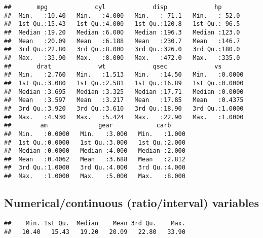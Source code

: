 \documentclass[
  a4paper,
]{article}
\newenvironment{Shaded}{\begin{snugshade}}{\end{snugshade}}
\newcommand{\FunctionTok}[1]{\textcolor[rgb]{0.13,0.29,0.53}{\textbf{#1}}}
\newcommand{\NormalTok}[1]{#1}
\newcommand{\SpecialCharTok}[1]{\textcolor[rgb]{0.81,0.36,0.00}{\textbf{#1}}}
\begin{document}
\begin{verbatim}
##       mpg             cyl             disp             hp       
##  Min.   :10.40   Min.   :4.000   Min.   : 71.1   Min.   : 52.0  
##  1st Qu.:15.43   1st Qu.:4.000   1st Qu.:120.8   1st Qu.: 96.5  
##  Median :19.20   Median :6.000   Median :196.3   Median :123.0  
##  Mean   :20.09   Mean   :6.188   Mean   :230.7   Mean   :146.7  
##  3rd Qu.:22.80   3rd Qu.:8.000   3rd Qu.:326.0   3rd Qu.:180.0  
##  Max.   :33.90   Max.   :8.000   Max.   :472.0   Max.   :335.0  
##       drat             wt             qsec             vs        
##  Min.   :2.760   Min.   :1.513   Min.   :14.50   Min.   :0.0000  
##  1st Qu.:3.080   1st Qu.:2.581   1st Qu.:16.89   1st Qu.:0.0000  
##  Median :3.695   Median :3.325   Median :17.71   Median :0.0000  
##  Mean   :3.597   Mean   :3.217   Mean   :17.85   Mean   :0.4375  
##  3rd Qu.:3.920   3rd Qu.:3.610   3rd Qu.:18.90   3rd Qu.:1.0000  
##  Max.   :4.930   Max.   :5.424   Max.   :22.90   Max.   :1.0000  
##        am              gear            carb      
##  Min.   :0.0000   Min.   :3.000   Min.   :1.000  
##  1st Qu.:0.0000   1st Qu.:3.000   1st Qu.:2.000  
##  Median :0.0000   Median :4.000   Median :2.000  
##  Mean   :0.4062   Mean   :3.688   Mean   :2.812  
##  3rd Qu.:1.0000   3rd Qu.:4.000   3rd Qu.:4.000  
##  Max.   :1.0000   Max.   :5.000   Max.   :8.000
\end{verbatim}

\subsection{Numerical/continuous (ratio/interval)
variables}\label{numericalcontinuous-ratiointerval-variables}

\begin{Shaded}
\end{Shaded}

\begin{verbatim}
##    Min. 1st Qu.  Median    Mean 3rd Qu.    Max. 
##   10.40   15.43   19.20   20.09   22.80   33.90
\end{verbatim}

\begin{Shaded}
\end{Shaded}
\end{document}
